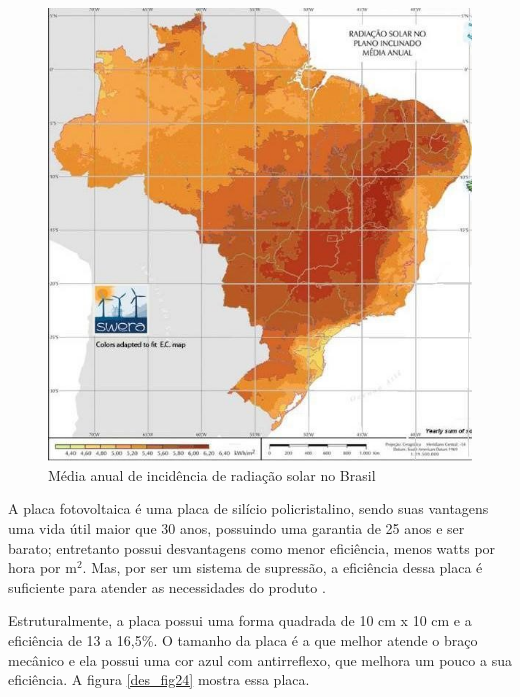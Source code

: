 \begin{figure}[H]
	\centering	\includegraphics[keepaspectratio=true,scale=0.57]{figuras/mapasolar_brasil.jpg}
	\caption{Média anual de incidência de radiação solar no Brasil}
	\label{des_fig23}
\end{figure}

A placa fotovoltaica é uma placa de silício policristalino, sendo suas vantagens uma vida útil maior que 30 anos, possuindo uma garantia de 25 anos e ser barato; entretanto possui desvantagens como menor eficiência, menos watts por hora por m$^2$. Mas, por ser um sistema de supressão, a eficiência dessa placa é suficiente para atender as necessidades do produto \cite{portalso1}.

Estruturalmente, a placa possui uma forma quadrada de 10 cm x 10 cm e a eficiência de 13 a 16,5\%. O tamanho da placa é a que melhor atende o braço mecânico e ela possui uma cor azul com antirreflexo, que melhora um pouco a sua eficiência. A figura \ref{des_fig24} mostra essa placa.

